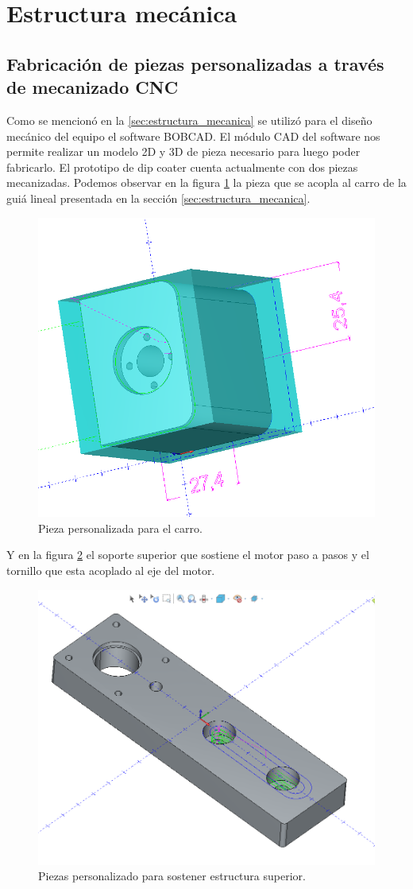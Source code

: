 
\section{Estructura mecánica}
\subsection{Fabricación de piezas personalizadas a través de mecanizado CNC}

Como se mencionó en la \ref{sec:estructura_mecanica} se utilizó para el diseño mecánico del equipo el software BOBCAD. El módulo CAD del software nos permite realizar un modelo 2D y 3D de pieza necesario para luego poder fabricarlo. El prototipo de dip coater cuenta actualmente con dos piezas mecanizadas. Podemos observar en la figura \ref{fig:carro} la pieza que se acopla al carro de la guiá lineal presentada en la sección \ref{sec:estructura_mecanica}.

\begin{figure}[ht]
	\centering
	\includegraphics[width=.5\textwidth]{./Figures/3d_carro.png}
	\caption{Pieza personalizada para el carro.}
	\label{fig:carro}
\end{figure}

Y en la figura \ref{fig:estructura_superior} el soporte superior que sostiene el motor paso a pasos y el  tornillo que esta acoplado al eje del motor.

\begin{figure}[ht]
	\centering
	\includegraphics[width=.5\textwidth]{./Figures/3d_top.png}
	\caption{Piezas personalizado para sostener estructura superior.}
	\label{fig:estructura_superior}
\end{figure}

